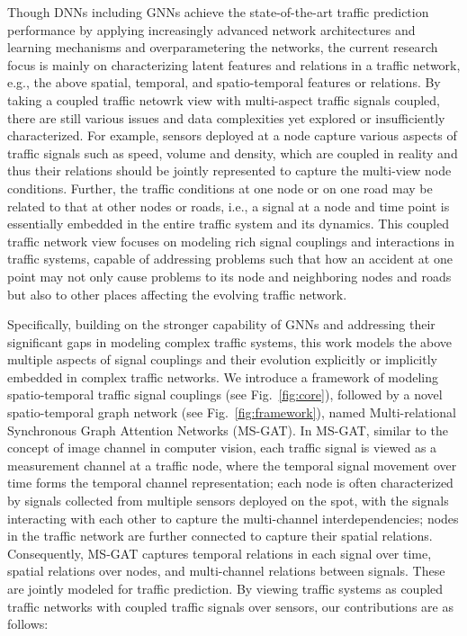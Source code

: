 Though DNNs including GNNs achieve the state-of-the-art traffic prediction performance by applying increasingly advanced network architectures and learning mechanisms and overparametering the networks, the current research focus is mainly on characterizing latent features and relations in a traffic network, e.g., the above spatial, temporal, and spatio-temporal features or relations. By taking a coupled traffic netowrk view with multi-aspect traffic signals coupled, there are still various issues and data complexities yet explored or insufficiently characterized. For example, sensors deployed at a node capture various aspects of traffic signals such as speed, volume and density, which are coupled in reality and thus their relations should be jointly represented to capture the multi-view node conditions. Further, the traffic conditions at one node or on one road may be related to that at other nodes or roads, i.e., a signal at a node and time point is essentially embedded in the entire traffic system and its dynamics. This coupled traffic network view focuses on modeling rich signal couplings and interactions in traffic systems, capable of addressing problems such that how an accident at one point may not only cause problems to its node and neighboring nodes and roads but also to other places affecting the evolving traffic network.

Specifically, building on the stronger capability of GNNs and addressing their significant gaps in modeling complex traffic systems, this work models the above multiple aspects of signal couplings and their evolution explicitly or implicitly embedded in complex traffic networks. We introduce a framework of modeling spatio-temporal traffic signal couplings (see Fig.~\ref{fig:core}), followed by a novel spatio-temporal graph network (see Fig.~\ref{fig:framework}), named Multi-relational Synchronous Graph Attention Networks (MS-GAT). In MS-GAT, similar to the concept of image channel in computer vision, each traffic signal is viewed as a measurement channel at a traffic node, where the temporal signal movement over time forms the temporal channel representation; each node is often characterized by signals collected from multiple sensors deployed on the spot, with the signals interacting with each other to capture the multi-channel interdependencies; nodes in the traffic network are further connected to capture their spatial relations. Consequently, MS-GAT captures temporal relations in each signal over time, spatial relations over nodes, and multi-channel relations between signals. These are jointly modeled for traffic prediction. By viewing traffic systems as coupled traffic networks with coupled traffic signals over sensors, our contributions are as follows:


